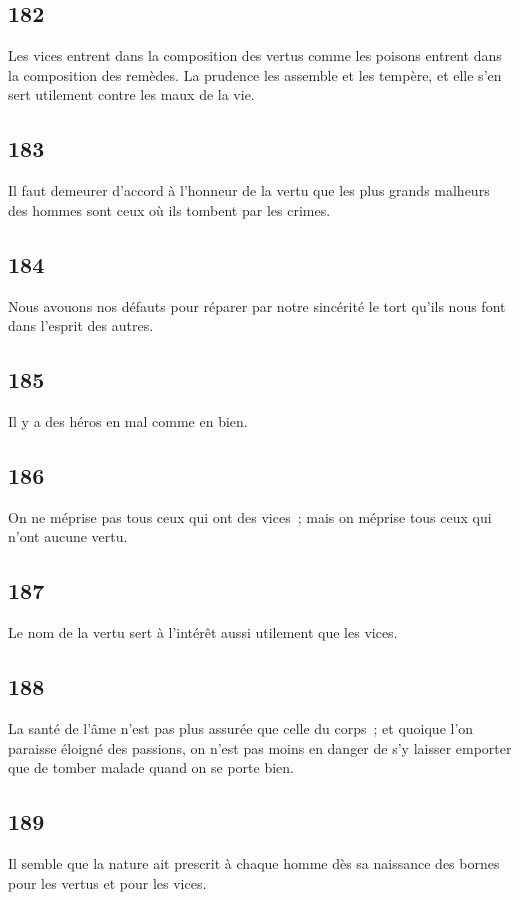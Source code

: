 \documentclass[french,twoside]{book} %
\begin{document}
\subsection[{182}]{ \textsc{182} }
\noindent Les vices entrent dans la composition des vertus comme les poisons entrent dans la composition des remèdes. La prudence les assemble et les tempère, et elle s’en sert utilement contre les maux de la vie.
\subsection[{183}]{ \textsc{183} }
\noindent Il faut demeurer d’accord à l’honneur de la vertu que les plus grands malheurs des hommes sont ceux où ils tombent par les crimes.
\subsection[{184}]{ \textsc{184} }
\noindent Nous avouons nos défauts pour réparer par notre sincérité le tort qu’ils nous font dans l’esprit des autres.
\subsection[{185}]{ \textsc{185} }
\noindent Il y a des héros en mal comme en bien.
\subsection[{186}]{ \textsc{186} }
\noindent On ne méprise pas tous ceux qui ont des vices ; mais on méprise tous ceux qui n’ont aucune vertu.
\subsection[{187}]{ \textsc{187} }
\noindent Le nom de la vertu sert à l’intérêt aussi utilement que les vices.
\subsection[{188}]{ \textsc{188} }
\noindent La santé de l’âme n’est pas plus assurée que celle du corps ; et quoique l’on paraisse éloigné des passions, on n’est pas moins en danger de s’y laisser emporter que de tomber malade quand on se porte bien.
\subsection[{189}]{ \textsc{189} }
\noindent Il semble que la nature ait prescrit à chaque homme dès sa naissance des bornes pour les vertus et pour les vices.
\end{document}
